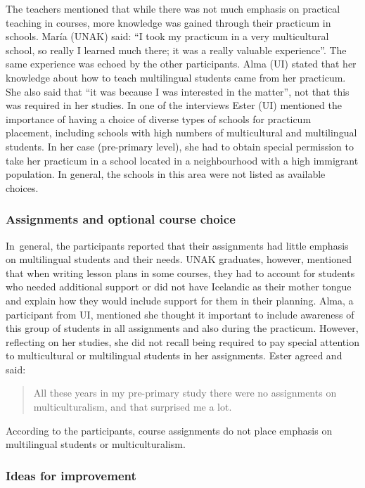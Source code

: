 \documentclass[output=paper]{langscibook}
\begin{document}
The teachers mentioned that while there was not much emphasis on practical teaching in courses, more knowledge was gained through their practicum in schools. María (UNAK) said: “I took my practicum in a very multicultural school, so really I learned much there; it was a really valuable experience”. The same experience was echoed by the other participants. Alma (UI) stated that her knowledge about how to teach multilingual students came from her practicum. She also said that “it was because I was interested in the matter”, not that this was required in her studies. In one of the interviews Ester (UI) mentioned the importance of having a choice of diverse types of schools for practicum placement, including schools with high numbers of multicultural and multilingual students. In her case (pre-primary level), she had to obtain special permission to take her practicum in a school located in a neighbourhood with a high immigrant population. In general, the schools in this area were not listed as available choices. 

\subsubsection{Assignments and optional course choice}  %

In~general, the participants reported that their assignments had little emphasis on multilingual students and their needs. UNAK graduates, however, mentioned that when writing lesson plans in some courses, they had to account for students who needed additional support or did not have Icelandic as their mother tongue and explain how they would include support for them in their planning. Alma, a participant from UI, mentioned she thought it important to include awareness of this group of students in all assignments and also during the practicum. However, reflecting on her studies, she did not recall being required to pay special attention to multicultural or multilingual students in her assignments. Ester agreed and said: 

\begin{quote}
All these years in my pre-primary study there were no assignments on multiculturalism, and that surprised me a lot.
\end{quote}

According to the participants, course assignments do not place emphasis on multilingual students or multiculturalism.

\subsubsection{Ideas for improvement} %
\end{document}

